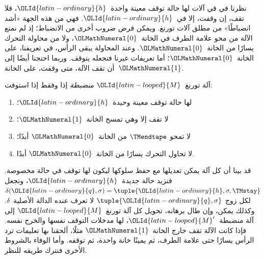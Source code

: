 \documentclass[../../../include/open-logic-section]{subfiles}
\begin{document}

\begin{explain}
نظرنا في  في آلات لها حالة توقف معينة واحدة~${\OLId{latin-ordinary}{h}}$، فلا تقف، إن وقفت، إلا في~${\OLId{latin-ordinary}{h}}$. فهي من هذه الجهة «أشد انضباطًا» من مطلق آلات تورنغ. ويمكن فرض ضروب أخرى من الانضباط؛ إذ لم نمنع الآلة من محو علامة الطرف في الخانة~${\OLMathNumeral{0}}$، ولا من محاولة التحرك يسارًا من الخانة~${\OLMathNumeral{0}}$. وعند المحاولة يبقى الرأس، في تعريفنا، على الخانة~${\OLMathNumeral{0}}$؛ أما تعريفات غيرنا فتجعله يتوقف. وربما احتجنا أيضًا إلى أن تقف الآلة، متى وقفت، على الخانة~${\OLMathNumeral{1}}$.
\end{explain}

\begin{defn}
آلة تورنغ~${\OLId{latin-looped}{M}}$ \emph{منضبطة} إذا وفقط إذا استوفت:
\begin{enumerate}
\item لها حالة توقف معينة وحيدة~${\OLId{latin-ordinary}{h}}$؛
\item لا تقف إلا وهي تمسح الخانة~${\OLMathNumeral{1}}$؛
\item لا تمحو $\TMendtape$ من الخانة~${\OLMathNumeral{0}}$ أبدًا؛
\item لا تحاول التحرك يسارًا من الخانة~${\OLMathNumeral{0}}$ أبدًا.
\end{enumerate}
\end{defn}

\begin{explain}
قد بينا أن كل آلة يمكن تعديلها مع حفظ سلوكها ليكون لها توقف في حالة مخصوصة. فنزيد حالة جديدة~${\OLId{latin-ordinary}{h}}$، ونجعل $\delta({\OLId{latin-ordinary}{q}},\sigma)=\tuple{{\OLId{latin-ordinary}{h}},\sigma,\TMstay}$ لكل زوج $\tuple{{\OLId{latin-ordinary}{q}},\sigma}$ لا تعرف عنده الدالة الأصلية~$\delta$. وكذلك يمكن، وإن طال برهانه، تحويل كل آلة تورنغ~${\OLId{latin-looped}{M}}$ إلى آلة منضبطة~${\OLId{latin-looped}{M}}'$، لها مدخلات التوقف نفسها والخرج نفسه. فإذا كانت الآلة تقف خارج الخانة~${\OLMathNumeral{1}}$ مثلًا، ألحقنا بها تعليمات ترد الرأس يسارًا حتى علامة الطرف، ثم يمينًا خانة واحدة، ثم توقفه. وأما الوفاء بالشروط الأخرى فنترك طريقه للنظر.
\end{explain}
\end{document}
